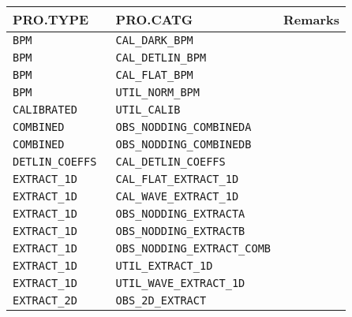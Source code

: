 \begin{tabular}{|l|l|l|}
    \hline
    \textbf{PRO.TYPE} &
    \textbf{PRO.CATG} &
    \textbf{Remarks} \\
    \hline
\texttt{BPM              } & \texttt{CAL\_DARK\_BPM}                & \\
\texttt{BPM              } & \texttt{CAL\_DETLIN\_BPM}              & \\
\texttt{BPM              } & \texttt{CAL\_FLAT\_BPM}                & \\
\texttt{BPM              } & \texttt{UTIL\_NORM\_BPM}               & \\
\texttt{CALIBRATED       } & \texttt{UTIL\_CALIB}                  & \\
\texttt{COMBINED         } & \texttt{OBS\_NODDING\_COMBINEDA}       & \\
\texttt{COMBINED         } & \texttt{OBS\_NODDING\_COMBINEDB}       & \\
\texttt{DETLIN\_COEFFS    } & \texttt{CAL\_DETLIN\_COEFFS}           & \\
\texttt{EXTRACT\_1D       } & \texttt{CAL\_FLAT\_EXTRACT\_1D}         & \\
\texttt{EXTRACT\_1D       } & \texttt{CAL\_WAVE\_EXTRACT\_1D}         & \\
\texttt{EXTRACT\_1D       } & \texttt{OBS\_NODDING\_EXTRACTA}        & \\
\texttt{EXTRACT\_1D       } & \texttt{OBS\_NODDING\_EXTRACTB}        & \\
\texttt{EXTRACT\_1D       } & \texttt{OBS\_NODDING\_EXTRACT\_COMB}    & \\
\texttt{EXTRACT\_1D       } & \texttt{UTIL\_EXTRACT\_1D}             & \\
\texttt{EXTRACT\_1D       } & \texttt{UTIL\_WAVE\_EXTRACT\_1D}        & \\
\texttt{EXTRACT\_2D       } & \texttt{OBS\_2D\_EXTRACT}        & \\


\end{tabular}
